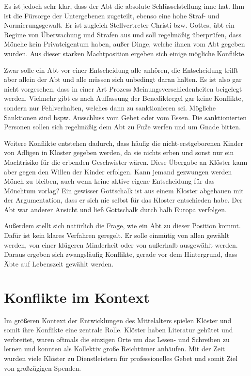 \documentclass[10pt,a4paper,oneside,ngerman,numbers=noenddot]{scrartcl}
\begin{document}
Es ist jedoch sehr klar, dass der Abt die absolute Schlüsselstellung inne hat.
Ihm ist die Fürsorge der Untergebenen zugeteilt, ebenso eine hohe Straf-
und Normierungsgewalt. Er ist zugleich Stellvertreter Christi bzw. Gottes,
übt ein Regime von Überwachung und Strafen aus und soll regelmäßig überprüfen,
dass Mönche kein Privateigentum haben, außer Dinge, welche ihnen vom Abt
gegeben wurden. Aus dieser starken Machtposition ergeben sich einige mögliche
Konflikte.

Zwar solle ein Abt vor einer Entscheidung alle anhören, die Entscheidung
trifft aber allein der Abt und alle müssen sich unbedingt daran halten. Es ist
also gar nicht vorgesehen, dass in einer Art Prozess Meinungsverschiedenheiten
beigelegt werden.
Vielmehr gibt es nach Auffassung der Benediktregel gar keine Konflikte,
sondern nur Fehlverhalten, welches dann zu sanktionieren sei. Mögliche Sanktionen
sind bspw. Ausschluss vom Gebet oder vom Essen. Die sanktionierten Personen
sollen sich regelmäßig dem Abt zu Fuße werfen und um Gnade bitten.

Weitere Konflikte entstehen dadurch, dass häufig die nicht-erstgeborenen
Kinder von Adligen in Klöster gegeben werden, da sie nichts erben und sonst
nur ein Machtrisiko für die erbenden Geschwister wären. Diese Übergabe
an Klöster kann aber gegen den Willen der Kinder erfolgen. Kann jemand gezwungen
werden Mönch zu bleiben, auch wenn keine aktive eigene Entscheidung für das
Mönchtum vorlag? Ein gewisser Gottschalk ist aus einem Kloster abgehauen mit
der Argumentation, dass er sich nie selbst für das Kloster entschieden habe.
Der Abt war anderer Ansicht und ließ Gottschalk durch halb Europa verfolgen.

Außerdem stellt sich natürlich die Frage, wie ein Abt zu dieser Position kommt.
Dafür ist kein klares Verfahren geregelt. Er solle einmütig von allen gewählt werden,
von einer klügeren Minderheit oder von außerhalb ausgewählt werden. Daraus
ergeben sich zwangsläufig Konflikte, gerade vor dem Hintergrund, dass Äbte auf
Lebenszeit gewählt werden.

\section{Konflikte im Kontext}

Im größeren Kontext der Entwicklungen des Mittelalters spielen Klöster
und somit ihre Konflikte eine zentrale Rolle. Klöster haben Literatur
gehütet und verbreitet, waren oftmals die einzigen Orte um das Lesen- und Schreiben
zu lernen und konnten als Kollektiv große Reichtümer anhäufen. Mit der Zeit
wurden viele Klöster zu Dienstleistern für professionelles Gebet und somit Ziel
von großzügigen Spenden.
\end{document}
